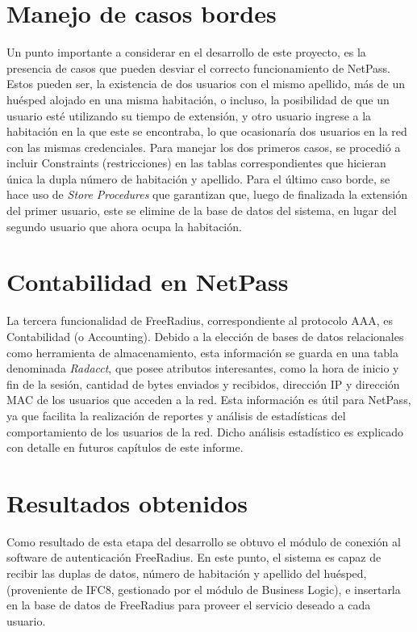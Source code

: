 \section{Manejo de casos bordes} \label{sect:Manejo de casos bordes}
		Un punto importante a considerar en el desarrollo de este proyecto, es la presencia de casos que pueden desviar el correcto funcionamiento de NetPass. Estos pueden ser, la existencia de dos usuarios con el mismo apellido, más de un huésped alojado en una misma habitación, o incluso, la posibilidad de que un usuario esté utilizando su tiempo de extensión, y otro usuario ingrese a la habitación en la que este se encontraba, lo que ocasionaría dos usuarios en la red con las mismas credenciales. 
\newline		
\newline
\indent Para manejar los dos primeros casos, se procedió a incluir Constraints (restricciones) en las tablas correspondientes que hicieran única la dupla número de habitación y apellido. Para el último caso borde, se hace uso de \textit{Store Procedures} que garantizan que, luego de finalizada la extensión del primer usuario, este se elimine de la base de datos del sistema, en lugar del segundo usuario que ahora ocupa la habitación.

\section{Contabilidad en NetPass} \label{sect:Contabilidad en NetPass}
		La tercera funcionalidad de FreeRadius, correspondiente al protocolo AAA, es Contabilidad (o Accounting). Debido a la elección de bases de datos relacionales como herramienta de almacenamiento, esta información se guarda en una tabla denominada \textit{Radacct}, que posee atributos interesantes, como la hora de inicio y fin de la sesión, cantidad de bytes enviados y recibidos, dirección IP y dirección MAC de los usuarios que acceden a la red.
\newline
\newline
\indent Esta información es útil para NetPass, ya que facilita la realización de reportes y análisis de estadísticas del comportamiento de los usuarios de la red. Dicho análisis estadístico es explicado con detalle en futuros capítulos de este informe.
		
\section{Resultados obtenidos} \label{sect:Resultados obtenidos}
		Como resultado de esta etapa del desarrollo se obtuvo el módulo de conexión al software de autenticación FreeRadius. En este punto, el sistema es capaz de recibir las duplas de datos, número de habitación y apellido del huésped, (proveniente de IFC8, gestionado por el módulo de Business Logic), e insertarla en la base de datos de FreeRadius para proveer el servicio deseado a cada usuario.
		
